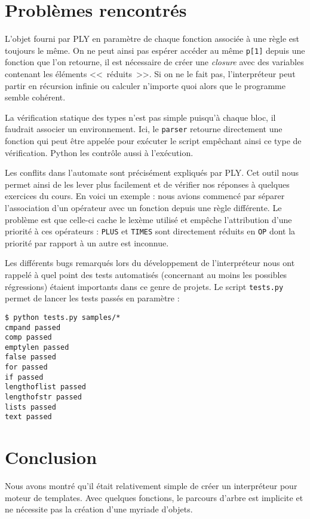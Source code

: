 \documentclass[12pt,twocolumn]{article}
\begin{document}
\section{Problèmes rencontrés}
L'objet fourni par PLY en paramètre de chaque fonction
associée à une règle est toujours le même. On ne peut ainsi
pas espérer accéder au même \texttt{p[1]} depuis une fonction
que l'on retourne, il est nécessaire de créer une \textit{closure}
avec des variables contenant les éléments <<~réduits~>>.
Si on ne le fait pas, l'interpréteur peut partir en récursion infinie
ou calculer n'importe quoi alors que le programme semble cohérent.

La vérification statique des types n'est pas simple puisqu'à chaque bloc,
il faudrait associer un environnement. Ici, le \texttt{parser} retourne
directement une fonction qui peut être appelée pour exécuter le script
empêchant ainsi ce type de vérification.
Python les contrôle aussi à l'exécution.

Les conflits dans l'automate sont précisément expliqués par PLY.
Cet outil nous permet ainsi de les lever plus facilement et de vérifier
nos réponses à quelques exercices du cours.
En voici un exemple : nous avions commencé par séparer l'association
d'un opérateur avec un fonction depuis une règle différente. Le problème
est que celle-ci cache le lexème utilisé et empêche l'attribution d'une
priorité à ces opérateurs : \texttt{PLUS} et \texttt{TIMES} sont directement
réduits en \texttt{OP} dont la priorité par rapport à un autre est inconnue.

Les différents bugs remarqués lors du développement de l'interpréteur
nous ont rappelé à quel point des tests automatisés (concernant au moins
les possibles régressions) étaient importants dans ce genre
de projets. Le script \texttt{tests.py} permet de lancer les tests
passés en paramètre :
\begin{verbatim}
$ python tests.py samples/*
cmpand passed
comp passed
emptylen passed
false passed
for passed
if passed
lengthoflist passed
lengthofstr passed
lists passed
text passed
\end{verbatim}


\section{Conclusion}
Nous avons montré qu'il était relativement simple de créer un interpréteur
pour moteur de templates. Avec quelques fonctions, le parcours d'arbre
est implicite et ne nécessite pas la création d'une myriade d'objets.
\end{document}

